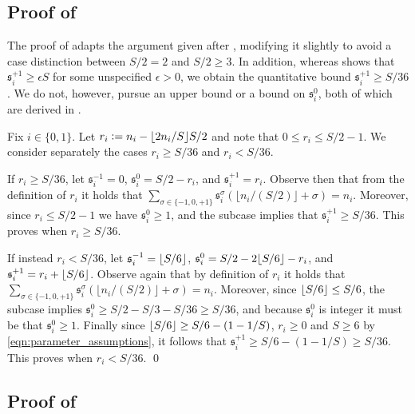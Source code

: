 \documentclass[11pt]{article}
\newcommand{\eqdef}{\vcentcolon=}
\newcommand{\mf}[1]{\mathfrak{#1}}
\DeclarePairedDelimiter\floor{\lfloor}{\rfloor}
\theoremstyle{definition}
\theoremstyle{definition}
\begin{document}
\subsection{Proof of \texorpdfstring{}{latent state subset size bounds}}
\label{sec:proof_of_latent_state_subset_sizes}

The proof of  adapts the argument given after \cite[Eqn. (5.2)]{zhang2016minimax}, modifying it slightly to avoid a case distinction between $S/2=2$ and $S/2\geq 3$.
In addition, whereas \cite{zhang2016minimax} shows that $\mf{s}_i^{+1}\geq \epsilon S$ for some unspecified $\epsilon>0$, we obtain the quantitative bound $\mf{s}_i^{+1}\geq S/36$.
We do not, however, pursue an upper bound or a bound on $\mf{s}_i^{0}$, both of which are derived in \cite{zhang2016minimax}.

Fix $i \in \{0, 1\}$.
Let $r_i \eqdef n_i - \floor{2 n_i / S}S/ 2$ and note that $0 \leq r_i\leq S/2 - 1$.
We consider separately the cases $r_i \geq S/36$ and $r_i< S/36$.

If $r_i \geq S/36$, let $\mf{s}^{-1}_i=0$, $\mf{s}^0_i = S/2 - r_i$, and $\mf{s}^{+1}_i = r_i$.
Observe then that from the definition of $r_i$ it holds that
$
	\sum_{\sigma\in\{-1,0,+1\}}
	\mf{s}^{\sigma}_i
	(
	\lfloor n_i/(S/2)\rfloor + \sigma
	)
	=
	n_i
	.
$
Moreover, since $r_i \leq S/2-1$ we  have $\mf{s}^0_i \geq 1$, and the subcase implies that $\mf{s}^{+1}_i \geq S/36$.
This proves  when $r_i\geq S/36$.

If instead $r_i< S/36$, let $\mf{s}^{-1}_i=\floor{S/6}$, $\mf{s}^0_i = S/2 - 2\floor{S/6}-r_i$, and $\mf{s}^{+1}_i = r_i + \floor{S/6}$.
Observe again that by definition of $r_i$ it holds that
$
	\sum_{\sigma\in\{-1,0,+1\}}
	\mf{s}^{\sigma}_i
	(
	\lfloor n_i/(S/2)\rfloor + \sigma
	)
	=
	n_i
	.
$
Moreover, since $\floor{S/6}\leq S/6$, the subcase implies $\mf{s}_i^0 \geq S/2 - S/3 - S/36 \geq S/36$, and because $\mf{s}_i^0$ is integer it must be that $\mf{s}_i^0 \geq 1$.
Finally since $\floor{S/6} \geq S/6 - (1-1/S)$, $r_i \geq 0$ and $S\geq 6$ by \eqref{eqn:parameter_assumptions}, it follows that $\mf{s}^{+1}_i \geq S/6 - (1-1/S) \geq S/36$.
This proves  when $r_i< S/36$.
\qed


\subsection{Proof of \texorpdfstring{}{reachability and identifiability}}
\label{sec:proof_of_kernel_allows_identifiability}
\end{document}
